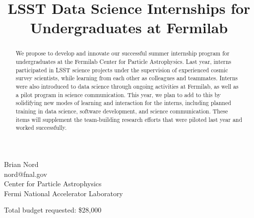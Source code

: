 \title{%
LSST Data Science Internships for Undergraduates at Fermilab}
\date{} %


\maketitle

\vspace{-1.5cm}
\begin{center}
Brian Nord \\ nord@fnal.gov \\
Center for Particle Astrophysics\\
Fermi National Accelerator Laboratory\\
\vspace{0.3cm}
\end{center}
\vspace{1.5cm}

\begin{abstract}
\normalsize
We propose to develop and innovate our successful summer internship program for undergraduates at the Fermilab Center for Particle Astrophysics.
Last year, interns participated in LSST science projects under the supervision of experienced cosmic survey scientists, while learning from each other as colleagues and teammates.
Interns were also introduced to data science through ongoing activities at Fermilab, as well as a pilot program in science communication. 
This year, we plan to add to this by solidifying new modes of learning and interaction for the interns, including planned training in data science, software development, and science communication.
These items will supplement the team-building research efforts that were piloted last year and worked successfully.
\end{abstract}

Total budget requested: \$28,000\par

